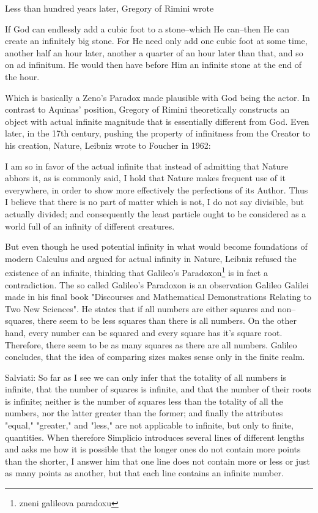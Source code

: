 \documentclass[12pt,a4paper]{article}
\begin{document}
Less than hundred years later, Gregory of Rimini wrote
\begin{displayquote}
If God can endlessly add a cubic foot to a stone–which He can–then He can create an infinitely big stone. For He need only add one cubic foot at some time, another half an hour later, another a quarter of an hour later than that, and so on ad infinitum. He would then have before Him an infinite stone at the end of the hour.
\end{displayquote}
Which is basically a Zeno's Paradox made plausible with God being the actor. In contrast to Aquinas' position, Gregory of Rimini theoretically constructs an object with actual infinite magnitude that is essentially different from God.
\medskip
Even later, in the 17th century, pushing the property of infinitness from the Creator to his creation, Nature, Leibniz wrote to Foucher in 1962:
\begin{displayquote}
I am so in favor of the actual infinite that instead of admitting that Nature abhors
it, as is commonly said, I hold that Nature makes frequent use of it everywhere,
in order to show more effectively the perfections of its Author. Thus I believe that
there is no part of matter which is not, I do not say divisible, but actually divided;
and consequently the least particle ought to be considered as a world full of an
infinity of different creatures.
\end{displayquote}
But even though he used potential infinity in what would become foundations of modern Calculus and argued for actual infinity in Nature, Leibniz refused the existence of an infinite, thinking that Galileo's Paradoxon\footnote{zneni galileova paradoxu} is in fact a contradiction. The so called Galileo's Paradoxon is an observation Galileo Galilei made in his final book "Discourses and Mathematical Demonstrations Relating to Two New Sciences".
He states that if all numbers are either squares and non–squares, there seem to be less squares than there is all numbers. On the other hand, every number can be squared and every square has it's square root. Therefore, there seem to be as many squares as there are all numbers. Galileo concludes, that the idea of comparing sizes makes sense only in the finite realm.
\begin{displayquote}
Salviati: So far as I see we can only infer that the totality of all numbers is infinite, that the number of squares is infinite, and that the number of their roots is infinite; neither is the number of squares less than the totality of all the numbers, nor the latter greater than the former; and finally the attributes "equal," "greater," and "less," are not applicable to infinite, but only to finite, quantities. When therefore Simplicio introduces several lines of different lengths and asks me how it is possible that the longer ones do not contain more points than the shorter, I answer him that one line does not contain more or less or just as many points as another, but that each line contains an infinite number.
\end{displayquote}
\end{document}
